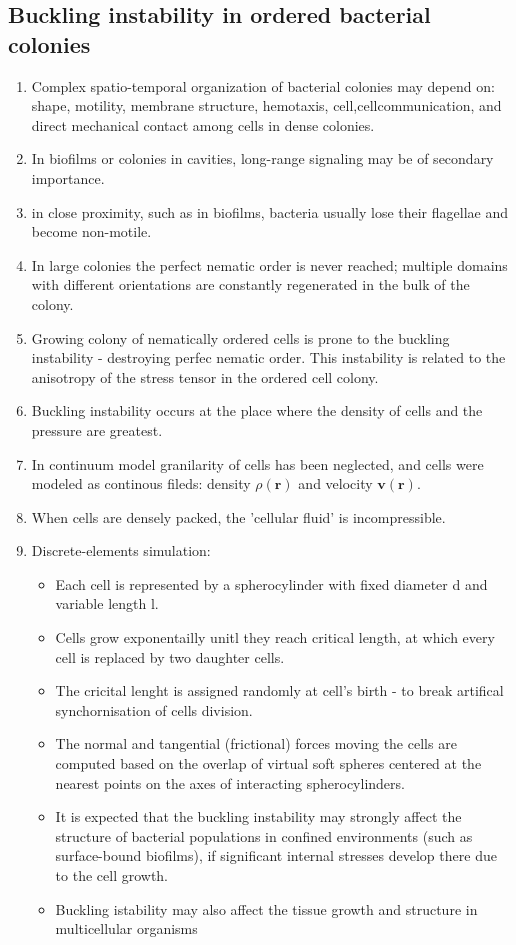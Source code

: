 \documentclass[10pt,a4paper]{article}
\begin{document}
\subsection{Buckling instability in ordered bacterial colonies \cite{tsimring:11}}
\begin{enumerate}
 \item Complex spatio-temporal organization of bacterial colonies may depend on:
 shape, motility, membrane structure, hemotaxis, cell,cellcommunication, and direct mechanical contact among cells in dense colonies.
 \item In biofilms or colonies in cavities, long-range signaling may be of secondary importance. 
 \item in close proximity, such as in biofilms, bacteria usually lose their flagellae and become non-motile.
 \item In large colonies the perfect nematic order is never reached; 
 multiple domains with different orientations are constantly regenerated in the bulk of the colony.
 \item Growing colony of nematically ordered cells is prone to the buckling instability - destroying  perfec nematic order. 
 This instability is related to the anisotropy of the stress tensor in the ordered cell colony.
 \item Buckling instability occurs at the place where the density of cells and the pressure are greatest.
 \item In continuum model granilarity of cells has been neglected, and cells were modeled as continous fileds: density $\rho(\mathbf{r})$ and velocity $\mathbf{v}(\mathbf{r})$.
 \item When cells are densely packed, the 'cellular fluid' is incompressible.
 \item Discrete-elements simulation:
 \begin{itemize}
  \item Each cell is represented by a spherocylinder with fixed diameter d and variable length l.
  \item Cells grow exponentailly unitl they reach critical length, at which every cell is replaced by two daughter cells.
  \item The cricital lenght is assigned randomly at cell's birth -  to break artifical synchornisation of cells division.
  \item The normal and tangential (frictional) forces moving the cells are computed based on the overlap of virtual soft spheres centered at the nearest points on the  axes of interacting spherocylinders.
  \item It is expected that the buckling instability may strongly affect the structure of bacterial populations 
  in confined environments (such as surface-bound biofilms), if significant internal stresses develop there due to the cell growth.
  \item Buckling istability may also affect the tissue growth and structure in multicellular organisms 
 \end{itemize}

\end{enumerate}
\end{document}

